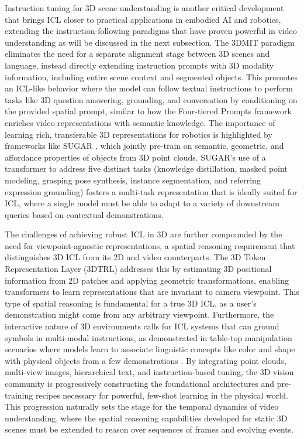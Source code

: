 \documentclass[11pt]{article}
\begin{document}
Instruction tuning for 3D scene understanding is another critical development that brings ICL closer to practical applications in embodied AI and robotics, extending the instruction-following paradigms that have proven powerful in video understanding as will be discussed in the next subsection. The 3DMIT paradigm \cite{ref260} eliminates the need for a separate alignment stage between 3D scenes and language, instead directly extending instruction prompts with 3D modality information, including entire scene context and segmented objects. This promotes an ICL-like behavior where the model can follow textual instructions to perform tasks like 3D question answering, grounding, and conversation by conditioning on the provided spatial prompt, similar to how the Four-tiered Prompts framework enriches video representations with semantic knowledge. The importance of learning rich, transferable 3D representations for robotics is highlighted by frameworks like SUGAR \cite{ref261}, which jointly pre-train on semantic, geometric, and affordance properties of objects from 3D point clouds. SUGAR's use of a transformer to address five distinct tasks (knowledge distillation, masked point modeling, grasping pose synthesis, instance segmentation, and referring expression grounding) fosters a multi-task representation that is ideally suited for ICL, where a single model must be able to adapt to a variety of downstream queries based on contextual demonstrations.

The challenges of achieving robust ICL in 3D are further compounded by the need for viewpoint-agnostic representations, a spatial reasoning requirement that distinguishes 3D ICL from its 2D and video counterparts. The 3D Token Representation Layer (3DTRL) \cite{ref262} addresses this by estimating 3D positional information from 2D patches and applying geometric transformations, enabling transformers to learn representations that are invariant to camera viewpoint. This type of spatial reasoning is fundamental for a true 3D ICL, as a user's demonstration might come from any arbitrary viewpoint. Furthermore, the interactive nature of 3D environments calls for ICL systems that can ground symbols in multi-modal instructions, as demonstrated in table-top manipulation scenarios where models learn to associate linguistic concepts like color and shape with physical objects from a few demonstrations \cite{ref263}. By integrating point clouds, multi-view images, hierarchical text, and instruction-based tuning, the 3D vision community is progressively constructing the foundational architectures and pre-training recipes necessary for powerful, few-shot learning in the physical world. This progression naturally sets the stage for the temporal dynamics of video understanding, where the spatial reasoning capabilities developed for static 3D scenes must be extended to reason over sequences of frames and evolving events.
\end{document}
